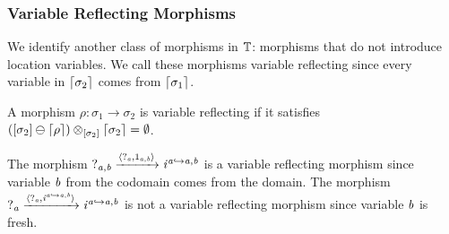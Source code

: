 \subsubsection{Variable Reflecting Morphisms}

We identify another class of morphisms in $\mathbb{T}$: morphisms that do not introduce location variables.
We call these morphisms variable reflecting since every variable in $\lceil\sigma_2\rceil$ comes from $\lceil\sigma_1\rceil$.
\begin{definition}
A morphism $\rho : \sigma_1 \to \sigma_2$ is variable reflecting if it satisfies $([\sigma_2] \ominus \lceil\rho\rceil) \otimes_{[\sigma_2]} \lceil\sigma_2\rceil = \emptyset$.
\end{definition}
\begin{example}
    The morphism $?_{\mathit{a},\mathit{b}} \xrightarrow{\langle?_{\mathit{a}}, 1_{\mathit{a},\mathit{b}}\rangle} \mathit{i}^{\mathit{a} \hookrightarrow \mathit{a},\mathit{b}}$ is a variable reflecting morphism since variable $\mathit{b}$ from the codomain comes from the domain.
    The morphism $?_{\mathit{a}} \xrightarrow{\langle?_{\mathit{a}}, \mathit{i}^{\mathit{a} \hookrightarrow \mathit{a},\mathit{b}}\rangle} \mathit{i}^{\mathit{a} \hookrightarrow \mathit{a}, \mathit{b}}$ is not a variable reflecting morphism since variable $\mathit{b}$ is fresh.
\end{example}

